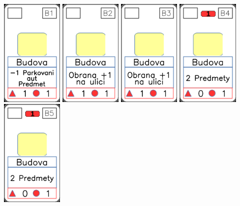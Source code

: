 \documentclass[a4paper]{article}
\begin{document}
	\includegraphics[width=3.0cm]{img-2_5}
	\includegraphics[width=3.0cm]{img-2_6}
	\includegraphics[width=3.0cm]{img-2_7}
	\includegraphics[width=3.0cm]{img-2_8}
	\includegraphics[width=3.0cm]{img-2_9}
\end{document}
